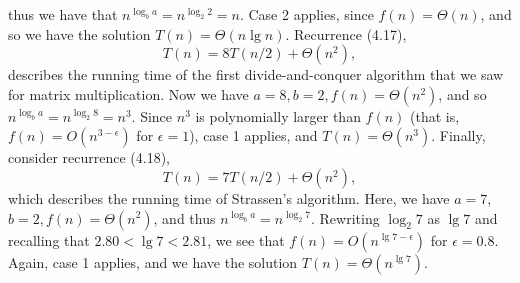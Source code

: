 \documentclass{report}
\begin{document}
        thus we have that \( n^{\log_b a} = n^{\log_2 2} = n \). Case 2 applies, since \( f(n) = \Theta(n) \), and so
        we have the solution \( T(n) = \Theta(n \lg n) \).
        \bigbreak \noindent 
        Recurrence (4.17),
        \[
            T(n) = 8T(n/2) + \Theta(n^2),
        \]
        describes the running time of the first divide-and-conquer algorithm that we saw
        for matrix multiplication. Now we have \( a = 8, b = 2, f(n) = \Theta(n^2) \),
        and so \( n^{\log_b a} = n^{\log_2 8} = n^3 \). Since \( n^3 \) is polynomially larger than \( f(n) \) (that is,
        \( f(n) = O(n^{3 - \epsilon}) \) for \( \epsilon = 1 \)), case 1 applies, and \( T(n) = \Theta(n^3) \).
        \bigbreak \noindent 
        Finally, consider recurrence (4.18),
        \[
            T(n) = 7T(n/2) + \Theta(n^2),
        \]
        which describes the running time of Strassen’s algorithm. Here, we have \( a = 7 \),
        \( b = 2, f(n) = \Theta(n^2) \), and thus \( n^{\log_b a} = n^{\log_2 7} \). Rewriting \( \log_2 7 \) as \( \lg 7 \) and
        recalling that \( 2.80 < \lg 7 < 2.81 \), we see that \( f(n) = O(n^{\lg 7 - \epsilon}) \) for \( \epsilon = 0.8 \).
        Again, case 1 applies, and we have the solution \( T(n) = \Theta(n^{\lg 7}) \).

        \pagebreak 
        \bigbreak \noindent



        
















































        

    
\end{document}
